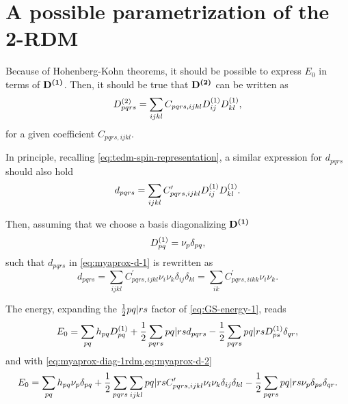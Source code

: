 \section{A possible parametrization of the 2-RDM} %
\label{sec:new-hypothesis}

Because of Hohenberg-Kohn theorems, it should be possible to express $E_0$ in
terms of $\boldsymbol{\mathrm{D^{\left( 1 \right)}}}$.
Then, it should be true that $\boldsymbol{\mathrm{D^{\left( 2 \right)}}}$ can be written as 
\begin{equation} \label{eq:myaprox-2rdm-1}
    D^{\left( 2 \right)}_{pqrs} = 
    \sum_{ijkl} C_{pqrs,ijkl} D^{\left( 1 \right)}_{ij} D^{\left( 1 \right)}_{kl}
    ,
\end{equation}
for a given coefficient $C_{pqrs,ijkl}$.

In principle, recalling \cref{eq:tedm-spin-representation}, a similar expression
for $d_{pqrs}$ should also hold
\begin{equation} \label{eq:myaprox-d-1}
    d_{pqrs} = 
    \sum_{ijkl} C_{pqrs,ijkl}^{\prime} D^{\left( 1 \right)}_{ij} D^{\left( 1 \right)}_{kl}
    .
\end{equation}

Then, assuming that we choose a basis diagonalizing $\boldsymbol{\mathrm{D^{\left( 1 \right)}}}$ 
\begin{equation} \label{eq:myaprox-diag-1rdm}
    D^{\left( 1 \right)}_{pq} = \nu_p \delta_{pq}
    ,
\end{equation}
such that $d_{pqrs}$ in \cref{eq:myaprox-d-1} is rewritten as
\begin{equation} \label{eq:myaprox-d-2}
    d_{pqrs} = 
    \sum_{ijkl} C_{pqrs,ijkl}^{\prime} \nu_i \nu_k \delta_{ij} \delta_{kl}
    =
    \sum_{ik} C_{pqrs,iikk}^{\prime} \nu_i \nu_k
    .
\end{equation}

The energy, expanding the $\frac{1}{2} \PBraket{pq | rs}$ factor of
\cref{eq:GS-energy-1}, reads
\begin{equation}
    E_0 =
    \sum_{pq} h_{pq} \oedm_{pq} +
    \frac{1}{2} \sum_{pqrs} \PBraket{pq | rs} d_{pqrs}
    - 
    \frac{1}{2} \sum_{pqrs} \PBraket{pq | rs} \oedm_{ps} \delta_{qr}
    ,
\end{equation}
and with \cref{eq:myaprox-diag-1rdm,eq:myaprox-d-2}
\begin{equation}
    E_0 =
    \sum_{pq} h_{pq} \nu_p \delta_{pq} +
    \frac{1}{2} \sum_{pqrs} \sum_{ijkl} \PBraket{pq | rs}
    C_{pqrs,ijkl}^{\prime} \nu_i \nu_k \delta_{ij} \delta_{kl}
    - 
    \frac{1}{2} \sum_{pqrs} \PBraket{pq | rs} \nu_p \delta_{ps} \delta_{qr}
    .
\end{equation}

